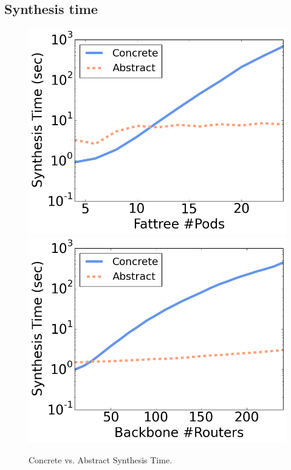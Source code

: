 \documentclass[numbers, 10pt]{sigplanconf}
\begin{document}
\subsection{Synthesis time}

\begin{figure}[t!]
    {\includegraphics[width=.49\columnwidth]{figures/Fattree-time.png}}
    {\includegraphics[width=.49\columnwidth]{figures/backbone-time.png}} \\
  \vspace{-.6em}
  \caption{Concrete vs. Abstract Synthesis Time. \label{fig:compilation-times}}
  \vspace{-1.2em}
\end{figure}
\end{document}
